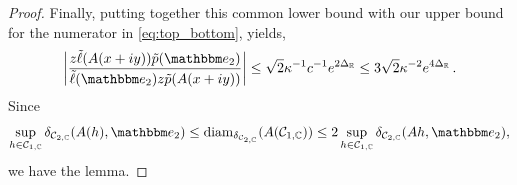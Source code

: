 \documentclass{amsart}
\numberwithin{equation}{section}
\newcommand\cC{{\mathcal C}}
\newcommand\bC{{\mathbb C}}
\newcommand\bR{{\mathbb R}}
\newcommand{\bbe}{\mathbbm e}
\newcommand{\diam}{\operatorname{diam}}
\begin{document}
\begin{proof}
Finally, putting together this common lower bound with our upper bound for the numerator in
\eqref{eq:top_bottom}, yields,
\begin{equation}
\label{eq:narrow bound}
 \left|\frac{z \tilde\ell(A(x+iy)) \tilde p(\bbe_2)}{\tilde\ell(\bbe_2)z \tilde p(A(x+iy))}\right|\leq \sqrt 2\kappa^{-1}  c^{-1} e^{2\Delta_{\bR}} 
 \le 3\sqrt{2} \kappa^{-2} e^{4 \Delta_\bR} \, . 
\end{equation}
Since
\begin{equation}
\label{eq:rad double}
\sup_{h\in\cC_{1, \bC}}\delta_{\cC_{2, \bC}}(A (h),\bbe_2)\leq \diam_{\delta_{\cC_{2,\bC}}}(A(\cC_{1,\bC}))\leq 2\sup_{h\in\cC_{1,\bC}}\delta_{\cC_{2, \bC}}(A h,\bbe_2),
\end{equation}
we have the lemma.
\end{proof}
\end{document}
